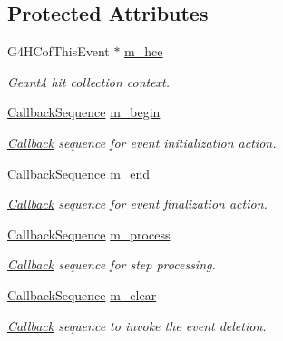 \subsection*{Protected Attributes}
\begin{DoxyCompactItemize}
\item 
G4\+H\+Cof\+This\+Event $\ast$ \hyperlink{class_d_d4hep_1_1_simulation_1_1_geant4_sens_det_action_sequence_a7a64aa4c2cd4c410962f951bd47d2116}{m\+\_\+hce}
\begin{DoxyCompactList}\small\item\em Geant4 hit collection context. \end{DoxyCompactList}\item 
\hyperlink{struct_d_d4hep_1_1_callback_sequence}{Callback\+Sequence} \hyperlink{class_d_d4hep_1_1_simulation_1_1_geant4_sens_det_action_sequence_a8feceb005db2ea028c4a778dd600b00b}{m\+\_\+begin}
\begin{DoxyCompactList}\small\item\em \hyperlink{class_d_d4hep_1_1_callback}{Callback} sequence for event initialization action. \end{DoxyCompactList}\item 
\hyperlink{struct_d_d4hep_1_1_callback_sequence}{Callback\+Sequence} \hyperlink{class_d_d4hep_1_1_simulation_1_1_geant4_sens_det_action_sequence_a15a09899c6ec50b8d14f4543362d9c91}{m\+\_\+end}
\begin{DoxyCompactList}\small\item\em \hyperlink{class_d_d4hep_1_1_callback}{Callback} sequence for event finalization action. \end{DoxyCompactList}\item 
\hyperlink{struct_d_d4hep_1_1_callback_sequence}{Callback\+Sequence} \hyperlink{class_d_d4hep_1_1_simulation_1_1_geant4_sens_det_action_sequence_a2ebfed15148432bab44c58ce3c7a0a95}{m\+\_\+process}
\begin{DoxyCompactList}\small\item\em \hyperlink{class_d_d4hep_1_1_callback}{Callback} sequence for step processing. \end{DoxyCompactList}\item 
\hyperlink{struct_d_d4hep_1_1_callback_sequence}{Callback\+Sequence} \hyperlink{class_d_d4hep_1_1_simulation_1_1_geant4_sens_det_action_sequence_a5d720697074ed4775143ebdae2073a16}{m\+\_\+clear}
\begin{DoxyCompactList}\small\item\em \hyperlink{class_d_d4hep_1_1_callback}{Callback} sequence to invoke the event deletion. \end{DoxyCompactList}\item 

\end{DoxyCompactItemize}
